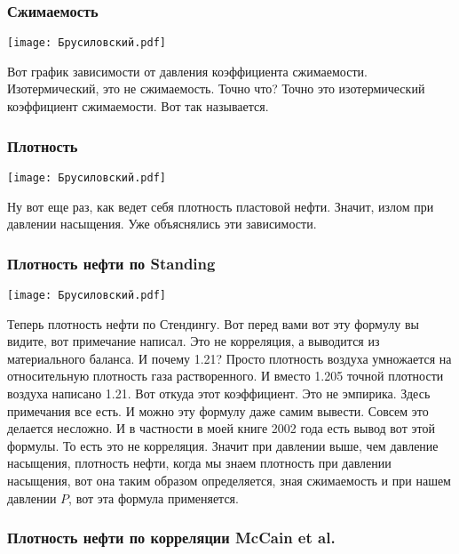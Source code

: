 \documentclass[main.tex]{subfiles}
\begin{document}
\subsubsection{Сжимаемость}

\begin{center}
\texttt{[image: Брусиловский.pdf]}
\end{center}

Вот график зависимости от давления коэффициента сжимаемости.
Изотермический, это не сжимаемость.
Точно что?
Точно это изотермический коэффициент сжимаемости.
Вот так называется.

\subsubsection{Плотность}

\begin{center}
\texttt{[image: Брусиловский.pdf]}
\end{center}

Ну вот еще раз, как ведет себя плотность пластовой нефти.
Значит, излом при давлении насыщения.
Уже объяснялись эти зависимости.

\subsubsection{Плотность нефти по Standing}

\begin{center}
\texttt{[image: Брусиловский.pdf]}
\end{center}

Теперь плотность нефти по Стендингу.
Вот перед вами вот эту формулу вы видите, вот примечание написал.
Это не корреляция, а выводится из материального баланса.
И почему 1.21?
Просто плотность воздуха умножается на относительную плотность газа растворенного.
И вместо 1.205 точной плотности воздуха написано 1.21.
Вот откуда этот коэффициент.
Это не эмпирика.
Здесь примечания все есть.
И можно эту формулу даже самим вывести.
Совсем это делается несложно.
И в частности в моей книге 2002 года есть вывод вот этой формулы.
То есть это не корреляция.
Значит при давлении выше, чем давление насыщения, плотность нефти, когда мы знаем плотность при давлении насыщения, вот она таким образом определяется, зная сжимаемость и при нашем давлении $P$, вот эта формула применяется.

\subsubsection{Плотность нефти по корреляции McCain et al.}
\end{document}
